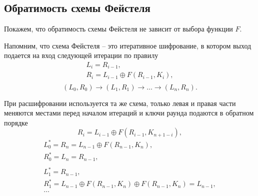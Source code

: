 ﻿\subsection{Обратимость схемы Фейстеля}

Покажем, что обратимость схемы Фейстеля не зависит от выбора функции $F$.

Напомним, что схема Фейстеля -- это итеративное шифрование, в котором выход подается на вход следующей итерации по правилу
\[ \begin{array}{l}
    L_i = R_{i-1}, \\
    R_i = L_{i-1} \oplus F(R_{i-1}, K_i), \\
\end{array} \]
\[
    (L_0,R_0) \rightarrow (L_1,R_1) \rightarrow \ldots \rightarrow (L_n,R_n).
\]

При расшифровании используется та же схема, только левая и правая части меняются местами перед началом итераций и ключи раунда подаются в обратном порядке
    \[ R_i = L_{i-1} \oplus F(R_{i-1}, K_{n+1-i}), \]
\[ \begin{array}{l}
    L_0^* = R_n = L_{n-1} \oplus F(R_{n-1}, K_n), \\
    R_0^* = L_n = R_{n-1}, \\
    \\
    L_1^* = R_{n-1}, \\
    R_1^* = L_{n-1} \oplus F(R_{n-1}, K_n) \oplus F(R_{n-1}, K_n) = L_{n-1}, \\
    \dots
\end{array} \]
